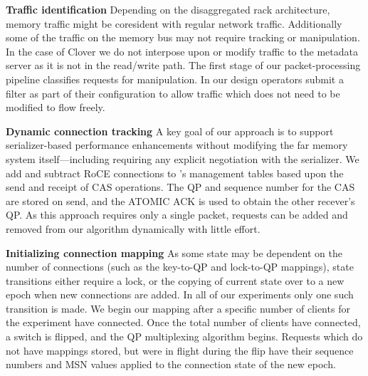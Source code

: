 \textbf{Traffic identification} Depending on the disaggregated
rack architecture, memory traffic might be coresident with regular
network traffic.  Additionally some of the traffic on the memory bus
may not require tracking or manipulation. In the case of Clover we do
not interpose upon or modify traffic to the metadata server as it is
not in the read/write path. The first stage of our packet-processing
pipeline classifies requests for manipulation. In our design operators
submit a filter as part of their configuration to allow traffic which does
not need to be modified to flow freely.

\textbf{Dynamic connection tracking}
 A key goal of our approach is to support
serializer-based performance enhancements without modifying the far memory
system itself---including requiring any explicit negotiation with the
serializer.  We add and subtract RoCE connections to {\sword}'s management
tables based upon the send and receipt of CAS operations. The QP and sequence
number for the CAS are stored on send, and the ATOMIC ACK is used to obtain the
other recever's QP.  As this approach requires only a single packet, requests
can be added and removed from our algorithm dynamically with little effort.

\textbf{Initializing connection mapping}
As some state may be dependent on the number of connections (such as the
key-to-QP and lock-to-QP mappings), state transitions either require a lock, or
the copying of current state over to a new epoch when new connections are added.
In all of our experiments only one such transition is made. We begin our mapping
after a specific number of clients for the experiment have connected. Once the
total number of clients have connected, a switch is flipped, and the QP
multiplexing algorithm begins. Requests which do not have mappings stored, but
were in flight during the flip have their sequence numbers and MSN values
applied to the connection state of the new epoch.




